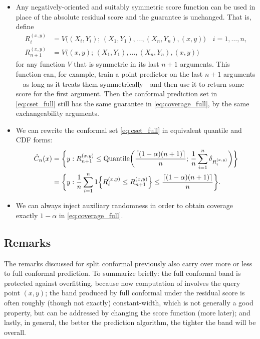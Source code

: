 \documentclass{article}
\begin{document}
\begin{itemize}
\item Any negatively-oriented and suitably symmetric score function can be used
  in place of the absolute residual score and the guarantee is unchanged. That
  is, define 
  \begin{align*}
  R_i^{(x,y)} &= V\Big( (X_i,Y_i); \, (X_1,Y_1), \dots, (X_n,Y_n), (x,y) \Big)
  \quad i=1,\dots,n, \\ 
  R_{n+1}^{(x,y)} &= V\Big( (x,y); \, (X_1,Y_1), \dots, (X_n,Y_n), (x,y) \Big)
  \end{align*}
  for any function $V$ that is symmetric in its last $n+1$ arguments. This
  function can, for example, train a point predictor on the last $n+1$
  arguments---as long as it treats them symmetrically---and then use it to
  return some score for the first argument. Then the conformal prediction set in
  \eqref{eq:cset_full} still has the same guarantee in \eqref{eq:coverage_full},
  by the same exchangeability arguments. 

\item We can rewrite the conformal set \eqref{eq:cset_full} in equivalent
  quantile and CDF forms:
\begin{align}
\hat{C}_n(x) 
\label{eq:cset_quant_full}
&= \bigg\{ y : R^{(x,y)}_{n+1} \leq \mathrm{Quantile}\bigg( \frac{\lceil (1-\alpha)(n+1) 
  \rceil}{n}; \, \frac{1}{n} \sum_{i=1}^n \delta_{R_i^{(x,y)}} \bigg) \bigg\} \\ 
\label{eq:cset_cdf_full}
&= \bigg\{ y : \frac{1}{n} \sum_{i=1}^n 1\Big\{ R_i^{(x,y)} \leq R^{(x,y)}_{n+1}
  \Big\} \leq \frac{\lceil (1-\alpha)(n+1) \rceil}{n} \bigg\}.   
\end{align}

\item We can always inject auxiliary randomness in order to obtain coverage
  exactly $1-\alpha$ in \eqref{eq:coverage_full}.
\end{itemize}

\subsection{Remarks}

The remarks discussed for split conformal previously also carry over more or
less to full conformal prediction. To summarize briefly: the full conformal band
is protected against overfitting, because now computation of
 involves the query point $(x,y)$; the band produced by
full conformal under the residual score is often roughly (though not exactly)
constant-width, which is not generally a good property, but can be addressed by
changing the score function (more later); and lastly, in general, the better the
prediction algorithm, the tighter the band will be overall. 
\end{document}
